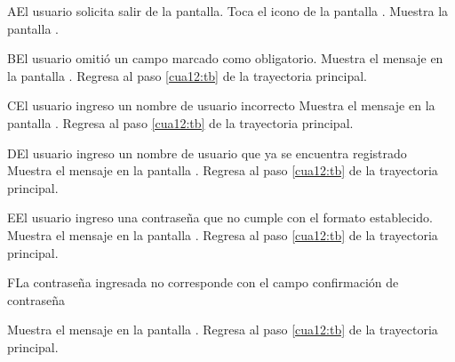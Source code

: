 
 \begin{UCtrayectoriaA}{A}{El usuario solicita salir de la pantalla.}
    \UCpaso[\UCactor] Toca el icono \btnRegresar de la pantalla .
	\UCpaso[\UCsist] Muestra la pantalla . 
 \end{UCtrayectoriaA}

 \begin{UCtrayectoriaA}{B}{El usuario omitió un campo marcado como obligatorio.}
 	\UCpaso[\UCsist] Muestra el mensaje  en la pantalla .
	\UCpaso[] Regresa al paso \ref{cua12:tb} de la trayectoria principal. 
	
\end{UCtrayectoriaA}


 \begin{UCtrayectoriaA}{C}{El usuario ingreso un nombre de usuario incorrecto}
	\UCpaso[\UCsist] Muestra el mensaje  en la pantalla .
	\UCpaso[] Regresa al paso \ref{cua12:tb} de la trayectoria principal. 
	
\end{UCtrayectoriaA}

 \begin{UCtrayectoriaA}{D}{El usuario ingreso un nombre de usuario que ya se encuentra registrado}
	\UCpaso[\UCsist] Muestra el mensaje  en la pantalla .
	\UCpaso[] Regresa al paso \ref{cua12:tb} de la trayectoria principal. 
	
\end{UCtrayectoriaA}

 \begin{UCtrayectoriaA}{E}{El usuario ingreso una contraseña que no cumple con el formato establecido.}
	\UCpaso[\UCsist] Muestra el mensaje  en la pantalla .
	\UCpaso[] Regresa al paso \ref{cua12:tb} de la trayectoria principal. 
\end{UCtrayectoriaA}

 \begin{UCtrayectoriaA}{F}{La contraseña ingresada no corresponde con el campo confirmación de contraseña}
	
	\UCpaso[\UCsist] Muestra el mensaje  en la pantalla .
	\UCpaso[] Regresa al paso \ref{cua12:tb} de la trayectoria principal.
	
\end{UCtrayectoriaA}

